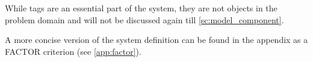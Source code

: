 While tags are an essential part of the system, they are not objects in the problem domain and will not be discussed again till \autoref{sc:model_component}.
\par
A more concise version of the system definition can be found in the appendix as a FACTOR criterion (see \autoref{app:factor}).